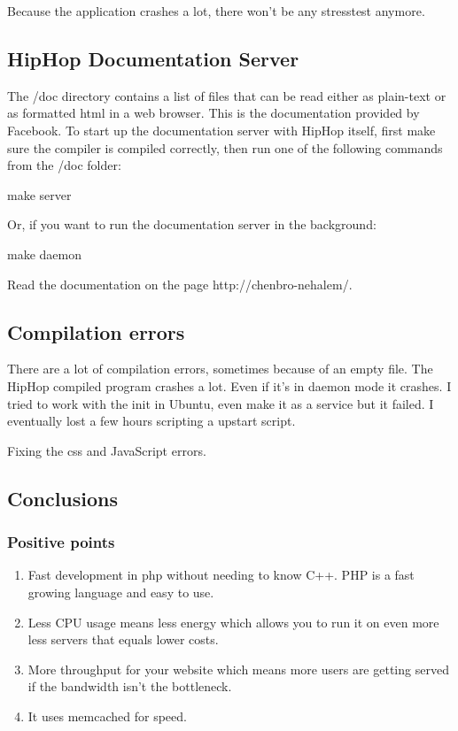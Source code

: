Because the application crashes a lot, there won't be any stresstest anymore.

\subsection{HipHop Documentation Server}
The /doc directory contains a list of files that can be read either as plain-text or as formatted \gls{html} in a web browser. This is the documentation provided by Facebook.
To start up the documentation server with HipHop itself, first make sure the compiler is compiled correctly, then run one of the following commands from the /doc folder:
\begin{codelisting} make server \end{codelisting}
Or, if you want to run the documentation server in the background:
\begin{codelisting}
make daemon
\end{codelisting}

Read the documentation on the page http://chenbro-nehalem/.

\subsection{Compilation errors}
There are a lot of compilation errors, sometimes because of an empty file.
The HipHop compiled program crashes a lot. Even if it's in daemon mode it crashes.
I tried to work with the init in Ubuntu, even make it as a service but it failed. I eventually lost a few hours scripting a upstart script.

Fixing the \gls{css} and JavaScript errors. \cite{hphp_fix_cssProblems}

\subsection{Conclusions}
\subsubsection{Positive points}
\begin{enumerate}
\item Fast development in \gls{php} without needing to know C++. PHP is a fast growing language and easy to use.
\item Less CPU usage means less energy which allows you to run it on even more less servers that equals lower costs.
\item More throughput for your website which means more users are getting served if the bandwidth isn't the bottleneck.
\item It uses \gls{memcached} for speed.
\end{enumerate}
